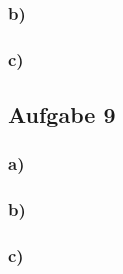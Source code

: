 \documentclass[11pt]{article}
\begin{document}
\subsubsection*{b)}

\subsubsection*{c)}

\subsection*{Aufgabe 9}
\subsubsection*{a)}

\subsubsection*{b)}

\subsubsection*{c)}
\end{document}
